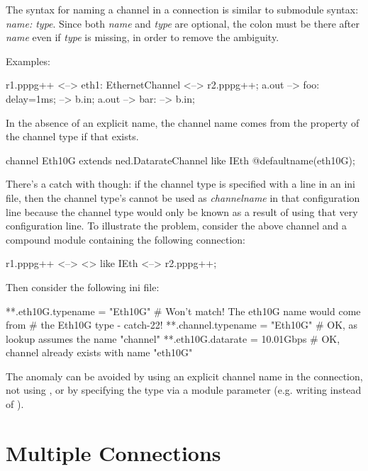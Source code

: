 The syntax for naming a channel in a connection is similar to submodule syntax:
\textit{name: type}. Since both \textit{name} and \textit{type} are optional,
the colon must be there after \textit{name} even if \textit{type} is missing,
in order to remove the ambiguity.

Examples:

\begin{ned}
r1.pppg++ <--> eth1: EthernetChannel <--> r2.pppg++;
a.out --> foo: {delay=1ms;} --> b.in;
a.out --> bar: --> b.in;
\end{ned}

In the absence of an explicit name, the channel name comes from the
 property of the channel type if that exists.

\begin{ned}
channel Eth10G extends ned.DatarateChannel like IEth {
    @defaultname(eth10G);
}
\end{ned}

There's a catch with  though: if the channel type is
specified with a  line in an ini file, then
the channel type's  cannot be used as \textit{channelname}
in that configuration line because the channel type would only be known as a
result of using that very configuration line. To illustrate the problem,
consider the above  channel and a compound module containing the
following connection:

\begin{ned}
r1.pppg++ <--> <> like IEth <--> r2.pppg++;
\end{ned}

Then consider the following ini file:

\begin{inifile}
**.eth10G.typename = "Eth10G"   # Won't match! The eth10G name would come from
                                #   the Eth10G type - catch-22!
**.channel.typename = "Eth10G"  # OK, as lookup assumes the name "channel"
**.eth10G.datarate = 10.01Gbps  # OK, channel already exists with name "eth10G"
\end{inifile}

The anomaly can be avoided by using an explicit channel name in the connection,
not using , or by specifying the type via a module parameter
(e.g. writing  instead of ).



\section{Multiple Connections}
\label{sec:ned-lang:multiple-connections}

